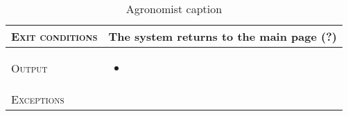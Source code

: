 \begin{table}[H]
\begin{tabular}[c]{|l|p{}|}
        \hline %
        \textsc{Exit conditions}    &  The system returns to the main page (?)\\
    	\hline %
    	\textsc{Output}             &  \begin{itemize}
    	    \item %
    	\end{itemize}\\
    	\hline %
    	\textsc{Exceptions}         &  %
    	\\
    	\hline %
        
    \end{tabular}
    \caption{\label{tab:Area_information_access}Agronomist caption }
\end{table}



